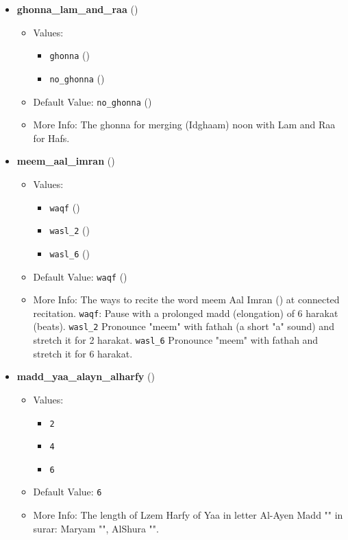 \begin{itemize}
\item \textbf{ghonna\_lam\_and\_raa} ()
  \begin{itemize}
  \item Values: 
    \begin{itemize}
    \item  \texttt{ghonna} ()
    \item  \texttt{no\_ghonna} ()
    \end{itemize}
  \item Default Value: \texttt{no\_ghonna} ()
  \item More Info: The ghonna for merging (Idghaam) noon with Lam and Raa for Hafs.
  \end{itemize}

\item \textbf{meem\_aal\_imran} ()
  \begin{itemize}
  \item Values: 
    \begin{itemize}
    \item  \texttt{waqf} ()
    \item  \texttt{wasl\_2} ()
    \item  \texttt{wasl\_6} ()
    \end{itemize}
  \item Default Value: \texttt{waqf} ()
  \item More Info: The ways to recite the word meem Aal Imran () at connected recitation. \texttt{waqf}: Pause with a prolonged madd (elongation) of 6 harakat (beats). \texttt{wasl\_2} Pronounce "meem" with fathah (a short "a" sound) and stretch it for 2 harakat. \texttt{wasl\_6} Pronounce "meem" with fathah and stretch it for 6 harakat.
  \end{itemize}

\item \textbf{madd\_yaa\_alayn\_alharfy} ()
  \begin{itemize}
  \item Values: 
    \begin{itemize}
    \item  \texttt{2}
    \item  \texttt{4}
    \item  \texttt{6}
    \end{itemize}
  \item Default Value: \texttt{6}
  \item More Info: The length of Lzem Harfy of Yaa in letter Al-Ayen Madd "" in surar: Maryam "", AlShura "".
  \end{itemize}


\end{itemize}
